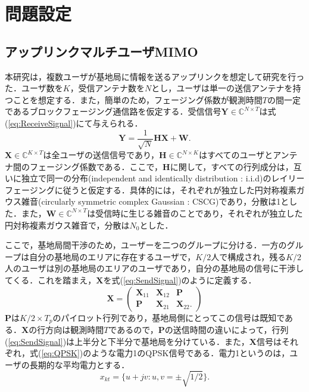 \section{問題設定}
\subsection{アップリンクマルチユーザMIMO}
本研究は，複数ユーザが基地局に情報を送るアップリンクを想定して研究を行った．ユーザ数を$K$，受信アンテナ数を$N$とし，ユーザは単一の送信アンテナを持つことを想定する．また，簡単のため，フェージング係数が観測時間$T$の間一定であるブロックフェージング通信路を仮定する．受信信号$\boldsymbol{Y}\in\mathbb{C}^{N\times T}$は式(\ref{eq:ReceiveSignal})にて与えられる．
\begin{equation} 
	\label{eq:ReceiveSignal}
	\boldsymbol{Y} = \frac{1}{\sqrt{N}}\boldsymbol{HX+W}.
\end{equation}
$\boldsymbol{X}\in\mathbb{C}^{K\times T}$は全ユーザの送信信号であり，$\boldsymbol{H}\in\mathbb{C}^{N\times K}$はすべてのユーザとアンテナ間のフェージング係数である．ここで，$\boldsymbol{H}$に関して，すべての行列成分は，互いに独立で同一の分布(independent and identically distribution : i.i.d)のレイリーフェージングに従うと仮定する．具体的には，それぞれが独立した円対称複素ガウス雑音(circularly symmetric complex Gaussian : CSCG)であり，分散は1とした．また，$\boldsymbol{W}\in\mathbb{C}^{N\times T}$は受信時に生じる雑音のことであり，それぞれが独立した円対称複素ガウス雑音で，分散は$N_0$とした．

ここで，基地局間干渉のため，ユーザーを二つのグループに分ける．一方のグループは自分の基地局のエリアに存在するユーザで，$K/2$人で構成され，残る$K/2$人のユーザは別の基地局のエリアのユーザであり，自分の基地局の信号に干渉してくる．これを踏まえ，$\boldsymbol{X}$を式(\ref{eq:SendSignal})のように定義する．
\begin{equation} 
	\label{eq:SendSignal}
	\boldsymbol{X} =  \left(
		\begin{array}{cccc}
			\boldsymbol{X}_{11} &\boldsymbol{X}_{12} &\boldsymbol{P}\\
			\boldsymbol{P} &\boldsymbol{X}_{21} &\boldsymbol{X}_{22}.
		\end{array}
	\right)
\end{equation}
$\boldsymbol{P}$は$K/2\times T_{p}$のパイロット行列であり，基地局側にとってこの信号は既知である．$\boldsymbol{X}$の行方向は観測時間$T$であるので，$\boldsymbol{P}$の送信時間の違いによって，行列(\ref{eq:SendSignal})は上半分と下半分で基地局を分けている．また，$\boldsymbol{X}$信号はそれぞれ，式(\ref{eq:QPSK})のような電力1のQPSK信号である．電力1というのは，ユーザの長期的な平均電力とする．
\begin{equation} 
	\label{eq:QPSK}
	x_{kt} = \{u+jv:u,v=\pm\sqrt{1/2}\}.
\end{equation}

